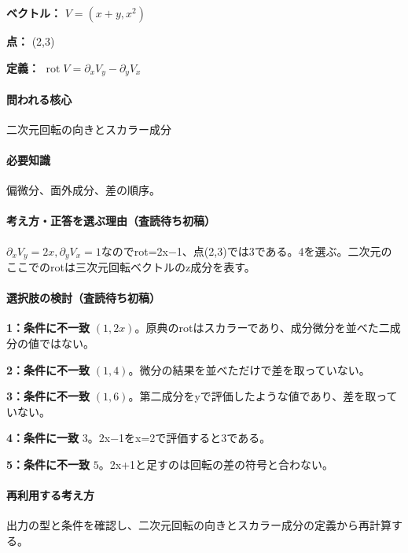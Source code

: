 \noindent\textbf{ベクトル：} \(V=(x+y,x^2)\)\par

\noindent\textbf{点：} (2,3)\par

\noindent\textbf{定義：} \(\operatorname{rot}V=\partial_xV_y-\partial_yV_x\)\par

\paragraph{問われる核心} 二次元回転の向きとスカラー成分

\paragraph{必要知識} 偏微分、面外成分、差の順序。

\paragraph{考え方・正答を選ぶ理由（査読待ち初稿）} \(\partial_xV_y=2x,\partial_yV_x=1\)なのでrot=\allowbreak{}2x−1、点(2,3)では3である。4を選ぶ。二次元のここでのrotは三次元回転ベクトルのz成分を表す。

\paragraph{選択肢の検討（査読待ち初稿）}\mbox{}\par

\noindent\textbf{1：条件に不一致} \((1,2x)\)。原典のrotはスカラーであり、成分微分を並べた二成分の値ではない。\par

\noindent\textbf{2：条件に不一致} \((1,4)\)。微分の結果を並べただけで差を取っていない。\par

\noindent\textbf{3：条件に不一致} \((1,6)\)。第二成分をyで評価したような値であり、差を取っていない。\par

\noindent\textbf{4：条件に一致} \(3\)。2x−1をx=\allowbreak{}2で評価すると3である。\par

\noindent\textbf{5：条件に不一致} \(5\)。2x+1と足すのは回転の差の符号と合わない。\par

\paragraph{再利用する考え方} 出力の型と条件を確認し、二次元回転の向きとスカラー成分の定義から再計算する。

